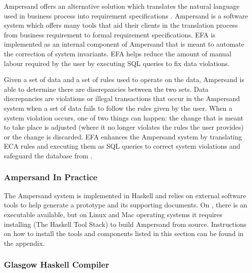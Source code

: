 \documentclass[journal,12pt,onecolumn,draftclsnofoot]{article}
\let\Oldsubsubsection\subsubsection
\renewcommand{\subsubsection}{\FloatBarrier\Oldsubsubsection}
\begin{document}
Ampersand offers an alternative solution which translates the natural language 
used in business process into requirement specifications
\cite{ruledesign}. 
Ampersand is a 
software system which offers many tools that aid their clients in the 
translation process from business requirement to formal requirement 
specifications. EFA is implemented as an internal component of Ampersand that 
is meant to automate the correction of system invariants. EFA helps reduce the 
amount of manual labour required by the user by executing SQL queries to fix 
data violations. %

Given a set of data and a set of rules used to operate on the data, Ampersand 
is able to determine  there are discrepancies between the two sets.
Data discrepancies are violations or illegal transactions
that occur in the Ampersand system
when a set of data fails to follow the rules given by the user.
When a system violation occurs,
one of two things can happen: the change that is meant to 
take place is adjusted (where it no longer violates the rules the user 
provides) or the change is discarded. EFA enhances the Ampersand system by 
translating ECA rules and executing them as SQL queries to correct system 
violations and safeguard the database from .

\subsubsection{Ampersand In Practice}

The Ampersand system is implemented in Haskell and relies on external software 
tools to help generate a prototype and its supporting documents.
On , 
there is an executable available, but on Linux and Mac operating systems it 
requires installing  (The Haskell Tool Stack)
to build Ampersand from source. 
Instructions on how to install the tools and components listed in this section 
can be found in the appendix.

\subsubsection*{Glasgow Haskell Compiler}
\end{document}
